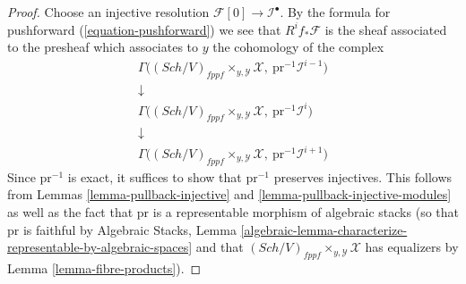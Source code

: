 \documentclass[10pt,a4paper]{amsart}
\theoremstyle{plain}
\theoremstyle{definition}
\theoremstyle{remark}
\numberwithin{equation}{subsection}
\def\Sch{\mathit{Sch}}
\begin{document}
\begin{proof}
Choose an injective resolution $\mathcal{F}[0] \to \mathcal{I}^\bullet$.
By the formula for pushforward (\ref{equation-pushforward}) we see that
$R^if_*\mathcal{F}$ is the sheaf associated to the presheaf which associates
to $y$ the cohomology of the complex
$$
\begin{matrix}
\Gamma\Big((\Sch/V)_{fppf} \times_{y, \mathcal{Y}} \mathcal{X},
\ \text{pr}^{-1}\mathcal{I}^{i - 1}\Big) \\
\downarrow \\
\Gamma\Big((\Sch/V)_{fppf} \times_{y, \mathcal{Y}} \mathcal{X},
\ \text{pr}^{-1}\mathcal{I}^i\Big) \\
\downarrow \\
\Gamma\Big((\Sch/V)_{fppf} \times_{y, \mathcal{Y}} \mathcal{X},
\ \text{pr}^{-1}\mathcal{I}^{i + 1}\Big)
\end{matrix}
$$
Since $\text{pr}^{-1}$ is exact, it suffices to show that
$\text{pr}^{-1}$ preserves injectives. This follows from
Lemmas \ref{lemma-pullback-injective} and
\ref{lemma-pullback-injective-modules}
as well as the fact that $\text{pr}$ is a representable morphism of
algebraic stacks (so that $\text{pr}$ is faithful by
Algebraic Stacks, Lemma
\ref{algebraic-lemma-characterize-representable-by-algebraic-spaces}
and that
$(\Sch/V)_{fppf} \times_{y, \mathcal{Y}} \mathcal{X}$
has equalizers by 
Lemma \ref{lemma-fibre-products}).
\end{proof}
\end{document}
